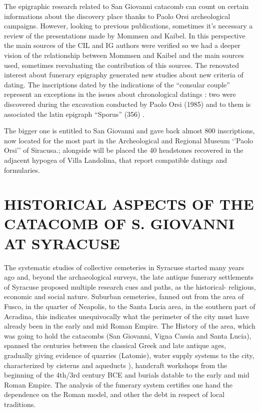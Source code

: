 \documentclass[amsthm,ebook]{saparticle}
\begin{document}
The epigraphic research related to San Giovanni catacomb can count on certain informations about the discovery place thanks to Paolo Orsi archeological campaigns. However, looking to previous publications, sometimes it’s necessary a review of the presentations made by Mommsen and Kaibel. In this perspective the main sources of the CIL and IG authors were verified so we had a deeper vision of the relationship between Mommsen and Kaibel and the main sources used, sometimes reevaluating the contribution of this sources. The renovated interest about funerary epigraphy generated new studies about new criteria of dating. The inscriptions dated by the indications of the ``consular couple'' represent an exceptions in the issues about chronological datings \citep[227]{FERRUA1947} \citep[nn. 191-208]{FERRUA1989}: two were discovered during the excavation conducted by Paolo Orsi (1985) and to them is associated the latin epigraph ``Sporus'' (356) .

The bigger one is entitled to San Giovanni and gave back almost 800 inscriptions, now located for the most part in the Archeological and Regional Museum ‘’Paolo Orsi’’ of Siracusa.; alongside will be placed the 40 headstones recovered in the adjacent hypogea of Villa Landolina, that report compatible datings and formularies.
 
\section{HISTORICAL ASPECTS OF THE CATACOMB OF S. GIOVANNI AT SYRACUSE}

\noindent The systematic studies of collective cemeteries in Syracuse started many years ago and, beyond the archaeological surveys, the late antique funerary settlements of Syracuse proposed multiple research cues and paths, as the historical- religious, economic and social nature.
Suburban cemeteries, fanned out from the area of Fusco, in the quarter of Neapolis, to the Santa Lucia area, in the southern part of Acradina, this indicates unequivocally what the perimeter of the city must have already been in the early and mid Roman Empire. The History of the area, which was going to hold the catacombs (San Giovanni, Vigna Cassia and Santa Lucia), spanned the centuries between the classical Greek and late antique ages, gradually giving evidence of quarries (Latomie), water supply systems to the city, characterized by cisterns and aqueducts \citep[682]{COLLINBOUFFIER1987}), handcraft workshops from the beginning of the 4th/3rd century BCE and burials datable to the early and mid Roman Empire. The analysis of the funerary system certifies one hand the dependence on the Roman model, and other the debt in respect of local traditions.
\end{document}
